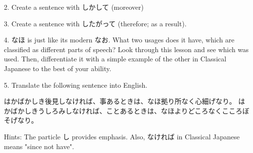 \par{2. Create a sentence with しかして (moreover) }

\par{3. Create a sentence with したがって (therefore; as a result). }

\par{4. なほ is just like its modern なお. What two usages does it have, which are classified as different parts of speech? Look through this lesson and see which was used. Then, differentiate it with a simple example of the other in Classical Japanese to the best of your ability. }

\par{5. Translate the following sentence into English. }

\par{はかばかしき後見しなければ、事あるときは、なほ拠り所なく心細げなり。 \hfill\break
はかばかしきうしろみしなければ、ことあるときは、なほよりどころなくこころぼそげなり。 }

\par{Hints: The particle し provides emphasis. Also, なければ in Classical Japanese means "since not have". }
    